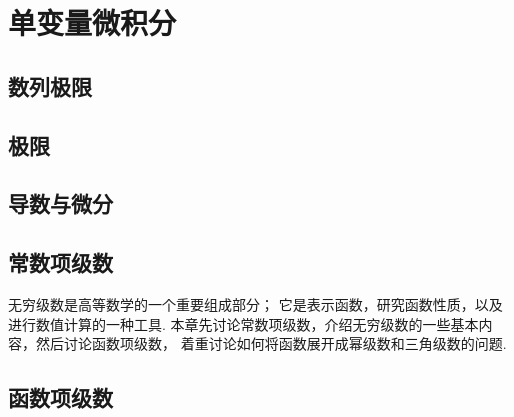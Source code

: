 \part{单变量微积分}


\chapter{数列极限}








\chapter{极限}















\chapter{导数与微分}\label{chapter:导数}









\chapter{常数项级数}
无穷级数是高等数学的一个重要组成部分；
它是表示函数，研究函数性质，以及进行数值计算的一种工具.
本章先讨论常数项级数，介绍无穷级数的一些基本内容，然后讨论函数项级数，
着重讨论如何将函数展开成幂级数和三角级数的问题.




\chapter{函数项级数}











